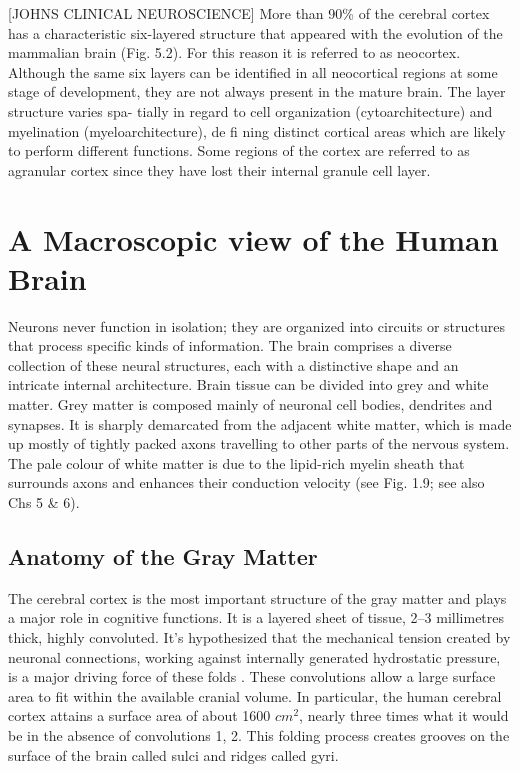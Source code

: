 [JOHNS CLINICAL NEUROSCIENCE]
More than 90\% of the cerebral cortex has a characteristic six-layered structure that appeared with the evolution of the mammalian brain (Fig. 5.2).
For this reason it is referred to as neocortex.
Although the same six layers can be identified in all neocortical regions at some stage of development, they are not always present in the mature brain.
The layer structure varies spa- tially in regard to cell organization (cytoarchitecture) and myelination (myeloarchitecture), de fi ning distinct cortical areas which are likely to perform different functions.\cite{Waehnert2014, Bok1929}
Some regions of the cortex are referred to as agranular cortex since they have lost their internal granule cell layer.


\section{A Macroscopic view of the Human Brain}

Neurons never function in isolation; they are organized into circuits or structures that process specific kinds of information.
The brain comprises a diverse collection of these neural structures, each with a distinctive shape and an intricate internal architecture.
Brain tissue can be divided into grey and white matter.
Grey matter is composed mainly of neuronal cell bodies, dendrites and synapses.
It is sharply demarcated from the adjacent white matter, which is made up mostly of tightly packed axons travelling to other parts of the nervous system.
The pale colour of white matter is due to the lipid-rich myelin sheath that surrounds axons and enhances their conduction velocity (see Fig. 1.9; see also Chs 5 & 6).

\subsection{Anatomy of the Gray Matter}

The cerebral cortex is the most important structure of the gray matter and plays a major role in cognitive functions.
It is a layered sheet of tissue, 2–3 millimetres thick, highly convoluted.
It's hypothesized that the mechanical tension created by neuronal connections, working against internally generated hydrostatic pressure, is a major driving force of these folds \cite{VanEssen1997}.
These convolutions allow a large surface area to fit within the available cranial volume.
In particular, the human cerebral cortex attains a surface area of about 1600 $cm^2$, nearly three times what it would be in the absence of convolutions 1, 2.
This folding process creates grooves on the surface of the brain called sulci and ridges called gyri.


